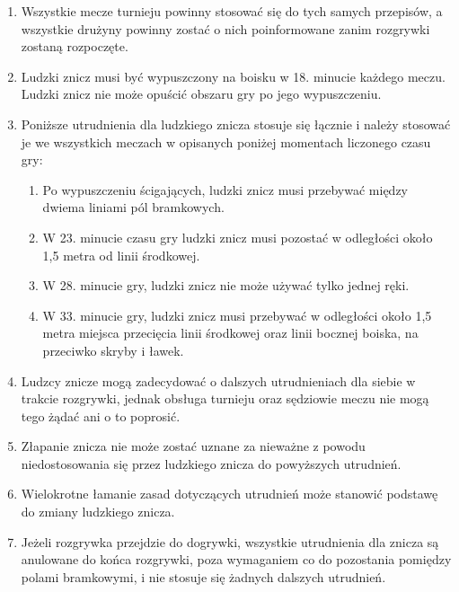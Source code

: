 \documentclass[12pt]{article}
\begin{document}
\begin{enumerate}
	\item Wszystkie mecze turnieju powinny stosować się do tych samych
	      przepisów, a wszystkie drużyny powinny zostać o nich poinformowane zanim
	      rozgrywki zostaną rozpoczęte.

	\item Ludzki znicz musi być wypuszczony na boisku w 18. minucie każdego
	      meczu. Ludzki znicz nie może opuścić obszaru gry po jego wypuszczeniu.

	\item Poniższe utrudnienia dla ludzkiego znicza stosuje się łącznie i
	      należy stosować je we wszystkich meczach w opisanych poniżej momentach
	      liczonego czasu gry:
	      \begin{enumerate}
		      \item Po wypuszczeniu ścigających, ludzki znicz musi przebywać między
		            dwiema liniami pól bramkowych.

		      \item W 23. minucie czasu gry ludzki znicz musi pozostać w odległości
		            około 1,5 metra od linii środkowej.

		      \item W 28. minucie gry, ludzki znicz nie może używać tylko jednej ręki.

		      \item W 33. minucie gry, ludzki znicz musi przebywać w odległości około
		            1,5 metra miejsca przecięcia linii środkowej oraz linii bocznej boiska,
		            na przeciwko skryby i ławek.
	      \end{enumerate}

	\item Ludzcy znicze mogą zadecydować o dalszych utrudnieniach dla siebie w
	      trakcie rozgrywki, jednak obsługa turnieju oraz sędziowie meczu nie mogą
	      tego żądać ani o to poprosić.

	\item Złapanie znicza nie może zostać uznane za nieważne z powodu
	      niedostosowania się przez ludzkiego znicza do powyższych utrudnień.

	\item Wielokrotne łamanie zasad dotyczących utrudnień może stanowić
	      podstawę do zmiany ludzkiego znicza.

	\item Jeżeli rozgrywka przejdzie do dogrywki, wszystkie utrudnienia dla
	      znicza są anulowane do końca rozgrywki, poza wymaganiem co do pozostania
	      pomiędzy polami bramkowymi, i nie stosuje się żadnych dalszych
	      utrudnień.


\end{enumerate}
\end{document}
